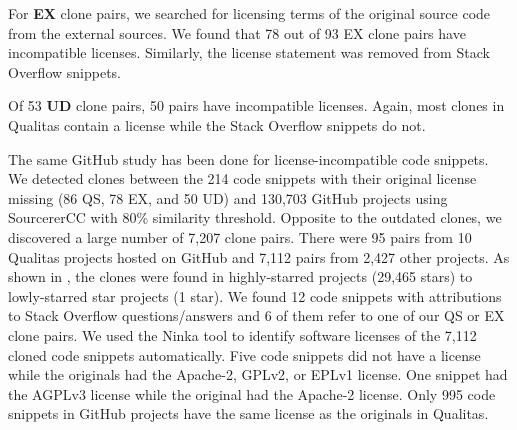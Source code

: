 \documentclass[10pt,journal,compsoc]{IEEEtran}
\begin{document}
For \textbf{EX}
clone pairs, we searched for licensing terms of the original source code from
the external sources. We found that 78 out of 93 EX clone pairs have
incompatible licenses. %
Similarly, the license statement was removed from Stack Overflow snippets. 

Of 53 \textbf{UD} clone pairs, 50 pairs have incompatible licenses. Again, most
clones in Qualitas contain a license while the Stack Overflow snippets do not.
%

The same GitHub study has been done for license-incompatible code snippets. 
We detected clones between the 214
code snippets with their original license missing (86 QS, 78 EX, and 50 UD)  and
130,703 GitHub projects using SourcererCC with 80\% similarity threshold.
Opposite to the outdated clones, we discovered a large number
of 7,207 clone pairs. There were 95 pairs from 10 Qualitas projects hosted on
GitHub and 7,112 pairs from 2,427 other projects. As shown in
, the clones were found in highly-starred
projects (29,465 stars) to lowly-starred star projects (1 star).
We found 12 code snippets with attributions to Stack Overflow questions/answers and
6 of them refer to one of our QS or EX clone pairs.
We used the Ninka tool to identify software licenses of the 7,112 cloned
code snippets automatically. 
Five code snippets did not have a license while the originals had the Apache-2, GPLv2,
or EPLv1 license. One snippet had the AGPLv3 license while the original had the Apache-2 license.
Only 995 code snippets in GitHub projects have the same license
as the originals in Qualitas.
\end{document}
